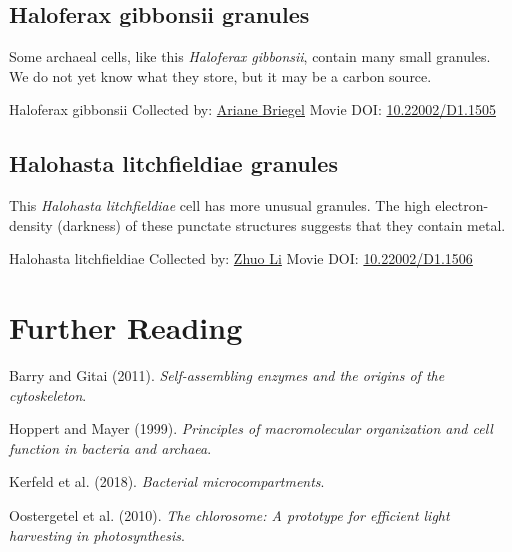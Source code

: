\documentclass[]{tufte-book}
\begin{document}
\hypertarget{Haloferax_gibbonsii_granules}{%
\subsection{Haloferax gibbonsii granules}\label{Haloferax_gibbonsii_granules}}

Some archaeal cells, like this \emph{Haloferax gibbonsii}, contain many small granules. We do not yet know what they store, but it may be a carbon source.



\hypertarget{htmlwidget-7cfe2c3958979127062e}{}

\label{fig:4-10a}Haloferax gibbonsii Collected by: \protect\hyperlink{ariane_briegel}{Ariane Briegel} Movie DOI: \href{https://doi.org/10.22002/D1.1505}{10.22002/D1.1505}

\hypertarget{Halohasta_litchfieldiae_granules}{%
\subsection{Halohasta litchfieldiae granules}\label{Halohasta_litchfieldiae_granules}}

This \emph{Halohasta litchfieldiae} cell has more unusual granules. The high electron-density (darkness) of these punctate structures suggests that they contain metal.



\hypertarget{htmlwidget-ed0a7dcea66d4fb8f704}{}

\label{fig:4-10b}Halohasta litchfieldiae Collected by: \protect\hyperlink{zhuo_li}{Zhuo Li} Movie DOI: \href{https://doi.org/10.22002/D1.1506}{10.22002/D1.1506}

\hypertarget{further-reading-3}{%
\section{Further Reading}\label{further-reading-3}}

Barry and Gitai (2011). \emph{Self-assembling enzymes and the origins of the cytoskeleton}.\citep{barry2011}

Hoppert and Mayer (1999). \emph{Principles of macromolecular organization and cell function in bacteria and archaea}.\citep{hoppert1999}

Kerfeld et al. (2018). \emph{Bacterial microcompartments}.\citep{kerfeld2018}

Oostergetel et al. (2010). \emph{The chlorosome: A prototype for efficient light harvesting in photosynthesis}.\citep{oostergetel2010}
\end{document}
